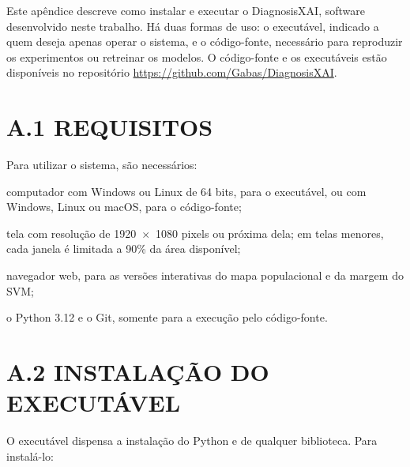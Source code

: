 \documentclass[
    12pt
    ,oneside
    ,a4paper
    ,chapter=TITLE
    ,section=TITLE
    ,sumario=abnt-6027-2012
    ,english,brazil]{abntex2} %
\begin{document}





Este apêndice descreve como instalar e executar o DiagnosisXAI, software
desenvolvido neste trabalho. Há duas formas de uso: o executável, indicado a
quem deseja apenas operar o sistema, e o código-fonte, necessário para
reproduzir os experimentos ou retreinar os modelos. O código-fonte e os
executáveis estão disponíveis no repositório
\url{https://github.com/Gabas/DiagnosisXAI}.

\section*{A.1 REQUISITOS}

Para utilizar o sistema, são necessários:

\begin{alineas}
    \item computador com Windows ou Linux de 64 bits, para o executável, ou com
          Windows, Linux ou macOS, para o código-fonte;
    \item tela com resolução de 1920~$\times$~1080 pixels ou próxima dela; em
          telas menores, cada janela é limitada a 90\% da área disponível;
    \item navegador web, para as versões interativas do mapa populacional e da
          margem do SVM;
    \item o Python 3.12 e o Git, somente para a execução pelo código-fonte.
\end{alineas}

\section*{A.2 INSTALAÇÃO DO EXECUTÁVEL}

O executável dispensa a instalação do Python e de qualquer biblioteca. Para
instalá-lo:
\end{document}

